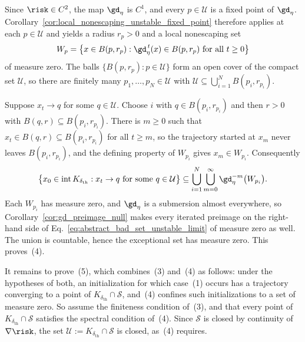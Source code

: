 \documentclass{article}
\begin{document}
Since $\risk\in C^2$, the map $\gd_\eta$ is $C^1$, and every $p\in\mathcal U$
is a fixed point of $\gd_\eta$. Corollary~\ref{cor:local_nonescaping_unstable_fixed_point}
therefore applies at each $p\in\mathcal U$ and yields a radius $r_p>0$ and a
local nonescaping set
\begin{align}
    W_p
    =
    \bigl\{
        x\in B(p,r_p):
        \gd_\eta^{\,t}(x)\in B(p,r_p)\ \text{for all }t\ge 0
    \bigr\}
\end{align}
of measure zero. The balls $\{B(p,r_p):p\in\mathcal U\}$ form an open
cover of the compact set $\mathcal U$, so there are finitely many
$p_1,\dots,p_N\in\mathcal U$ with
$\mathcal U\subseteq\bigcup_{i=1}^N B(p_i,r_{p_i})$.

Suppose $x_t\to q$ for some $q\in\mathcal U$. Choose $i$ with
$q\in B(p_i,r_{p_i})$ and then $r>0$ with $B(q,r)\subseteq B(p_i,r_{p_i})$.
There is $m\ge 0$ such that $x_t\in B(q,r)\subseteq B(p_i,r_{p_i})$ for all
$t\ge m$, so the trajectory started at $x_m$ never leaves $B(p_i,r_{p_i})$, and
the defining property of $W_{p_i}$ gives $x_m\in W_{p_i}$. Consequently
\begin{align}
    \bigl\{
        x_0\in\operatorname{int}K_{\delta_{\mathrm{th}}}:
        x_t\to q\ \text{for some } q\in\mathcal U
    \bigr\}
    \subseteq
    \bigcup_{i=1}^N
    \bigcup_{m=0}^\infty
    \gd_\eta^{-m}\bigl(W_{p_i}\bigr).
    \label{eq:abstract_bad_set_unstable_limit}
\end{align}
Each $W_{p_i}$ has measure zero, and $\gd_\eta$ is a submersion almost
everywhere, so Corollary~\ref{cor:gd_preimage_null} makes every iterated
preimage on the right-hand side of
Eq.~\eqref{eq:abstract_bad_set_unstable_limit} of measure zero as well. The
union is countable, hence the exceptional set has measure zero. This
proves~(4).

It remains to prove~(5), which combines~(3) and~(4) as follows: under the
hypotheses of both, an initialization for which case~(1) occurs has a
trajectory converging to a point of $K_{\delta_{\mathrm{th}}}\cap\mathcal S$,
and~(4) confines such initializations to a set of measure zero. So assume the
finiteness condition of~(3), and that every point of
$K_{\delta_{\mathrm{th}}}\cap\mathcal S$ satisfies the spectral condition
of~(4). Since $\mathcal S$ is closed by continuity of $\nabla\risk$, the set
$\mathcal U:=K_{\delta_{\mathrm{th}}}\cap\mathcal S$ is closed, as~(4)
requires.
\end{document}
